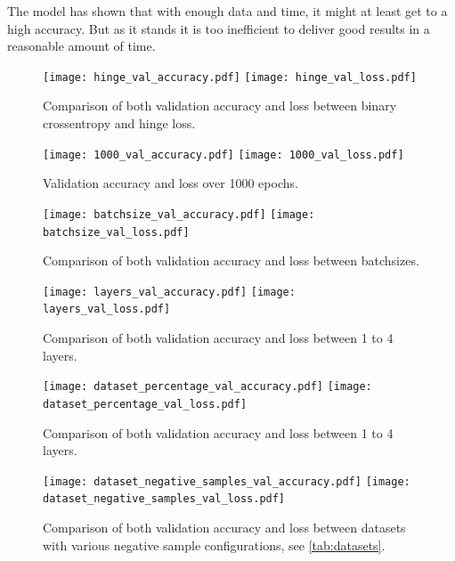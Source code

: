 \documentclass[
	ngerman,
	ruledheaders=section,%
	class=report,%
	thesis={type=bachelor},%
	accentcolor=9c,%
	custommargins=true,%
	marginpar=false,%
	parskip=half-,%
	fontsize=11pt,%
]{tudapub}
\begin{document}
The model has shown that with enough data and time, it might at least get to a high accuracy.
But as it stands it is too inefficient to deliver good results in a reasonable amount of time.

\begin{figure}
    \texttt{[image: hinge\_val\_accuracy.pdf]}
    \texttt{[image: hinge\_val\_loss.pdf]}
    \caption{Comparison of both validation accuracy and loss between binary crossentropy and hinge loss.} %
    \label{fig:hinge}
\end{figure}

\begin{figure}
    \texttt{[image: 1000\_val\_accuracy.pdf]}
    \texttt{[image: 1000\_val\_loss.pdf]}
    \caption{Validation accuracy and loss over 1000 epochs.} %
    \label{fig:1000epochs}
\end{figure}

\begin{figure}
    \texttt{[image: batchsize\_val\_accuracy.pdf]}
    \texttt{[image: batchsize\_val\_loss.pdf]}
    \caption{Comparison of both validation accuracy and loss between batchsizes.} %
    \label{fig:batchsize}
\end{figure}

\begin{figure}
    \texttt{[image: layers\_val\_accuracy.pdf]}
    \texttt{[image: layers\_val\_loss.pdf]}
    \caption{Comparison of both validation accuracy and loss between 1 to 4 layers.} %
    \label{fig:layers}
\end{figure}

\begin{figure}
    \texttt{[image: dataset\_percentage\_val\_accuracy.pdf]}
    \texttt{[image: dataset\_percentage\_val\_loss.pdf]}
    \caption{Comparison of both validation accuracy and loss between 1 to 4 layers.} %
    \label{fig:dataset_percentage}
\end{figure}

\begin{figure}
    \texttt{[image: dataset\_negative\_samples\_val\_accuracy.pdf]}
    \texttt{[image: dataset\_negative\_samples\_val\_loss.pdf]}
    \caption{Comparison of both validation accuracy and loss between datasets with various negative sample configurations, see \ref{tab:datasets}.} %
    \label{fig:dataset_negative}
\end{figure}
\end{document}
